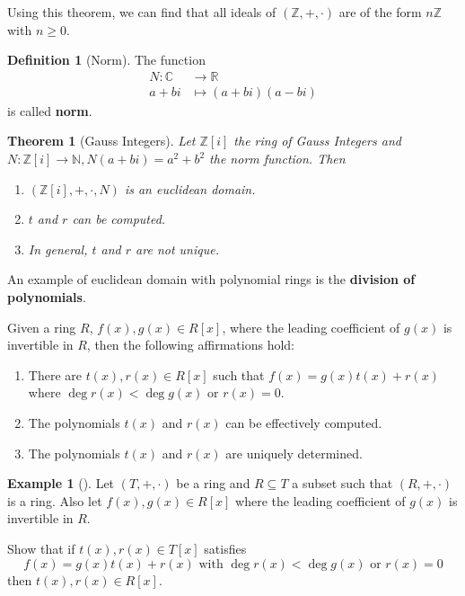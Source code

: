 \documentclass[12pt,a4paper]{article}
\newtheorem{theorem}{Theorem}[section]
\theoremstyle{definition}
\newtheorem{example}{Example}[section]
\newtheorem{definition}{Definition}[section]
\begin{document}
Using this theorem, we can find that all ideals of $(\mathbb{Z},+,\cdot)$ are of the form $n \mathbb{Z}$ with $n \geq 0$.

\begin{definition}[Norm]
The function
\begin{equation*}
\begin{aligned}
N : \mathbb{C} & \to \mathbb{R} \\
a+bi & \mapsto (a+bi)(a-bi)
\end{aligned}
\end{equation*}
is called \textbf{norm}.
\end{definition}

\begin{theorem}[Gauss Integers]
Let $\mathbb{Z}[i]$ the ring of Gauss Integers and $N : \mathbb{Z}[i] \to \mathbb{N}, N(a+bi) = a^2+b^2$ the norm function. Then
\begin{enumerate}
\item $(\mathbb{Z}[i],+,\cdot,N)$ is an euclidean domain.
\item $t$ and $r$ can be computed.
\item In general, $t$ and $r$ are not unique.
\end{enumerate}
\end{theorem}

An example of euclidean domain with polynomial rings is the \textbf{division of polynomials}.

Given a ring $R$, $f(x), g(x) \in R[x]$, where the leading coefficient of $g(x)$ is invertible in $R$, then the following affirmations hold:
\begin{enumerate}
\item There are $t(x), r(x) \in R[x]$ such that $f(x) = g(x)t(x) + r(x)$ where $\deg r(x) < \deg g(x)$ or $r(x) = 0$.
\item The polynomials $t(x)$ and $r(x)$ can be effectively computed.
\item The polynomials $t(x)$ and $r(x)$ are uniquely determined.
\end{enumerate}

\begin{example}[]
Let $(T,+,\cdot)$ be a ring and $R \subseteq T$ a subset such that $(R,+,\cdot)$ is a ring. Also let $f(x), g(x) \in R[x]$ where the leading coefficient of $g(x)$ is invertible in $R$.

Show that if $t(x), r(x) \in T[x]$ satisfies
\[
f(x) = g(x) t(x) + r(x) \text{ with } \deg r(x) < \deg g(x) \text{ or } r(x) = 0
\]
then $t(x), r(x) \in R[x]$.
\end{example}
\end{document}
